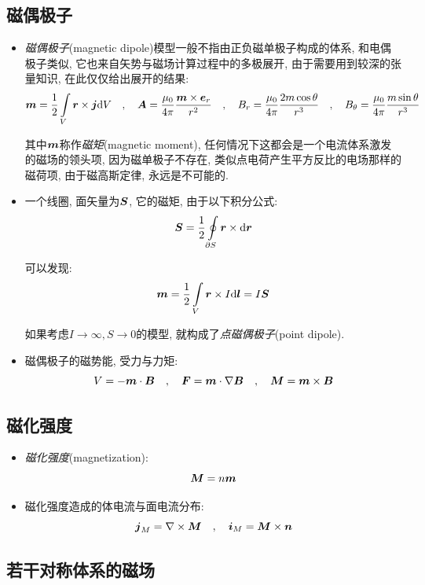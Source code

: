 \subsection{磁偶极子}

\begin{itemize}
\item \emph{磁偶极子}(magnetic dipole)模型一般不指由正负磁单极子构成的体系, 和电偶极子类似, 它也来自矢势与磁场计算过程中的多极展开, 由于需要用到较深的张量知识, 在此仅仅给出展开的结果:
\[\boldsymbol{m}=\frac{1}{2}\int\limits_V \boldsymbol{r}\times \boldsymbol{j}\textrm{d} V\quad ,\quad \boldsymbol{A}=\frac{\mu_0}{4\pi}\frac{\boldsymbol{m}\times \boldsymbol{e}_r}{r^2}\quad ,\quad B_r=\frac{\mu_0}{4\pi}\frac{2m\cos\theta }{r^3}\quad ,\quad B_\theta=\frac{\mu_0}{4\pi}\frac{m\sin\theta }{r^3}\]

其中$\boldsymbol{m}$称作\emph{磁矩}(magnetic moment), 任何情况下这都会是一个电流体系激发的磁场的领头项, 因为磁单极子不存在, 类似点电荷产生平方反比的电场那样的磁荷项, 由于磁高斯定律, 永远是不可能的.

\item 一个线圈, 面矢量为$\boldsymbol{S}$, 它的磁矩, 由于以下积分公式:
\[\boldsymbol{S}=\frac{1}{2}\oint\limits_{\partial S}\boldsymbol{r}\times \textrm{d} \boldsymbol{r}\]

可以发现:
\[\boldsymbol{m}=\frac{1}{2}\int\limits_V \boldsymbol{r}\times I \textrm{d} \boldsymbol{l}=I\boldsymbol{S}\]

如果考虑$I\to \infty, S\to 0$的模型, 就构成了\emph{点磁偶极子}(point dipole).

\item 磁偶极子的磁势能, 受力与力矩:
\[V=-\boldsymbol{m}\cdot \boldsymbol{B}\quad ,\quad \boldsymbol{F}=\boldsymbol{m}\cdot \nabla\boldsymbol{B}\quad ,\quad \boldsymbol{M}=\boldsymbol{m}\times \boldsymbol{B}\]

\end{itemize}

\subsection{磁化强度}

\begin{itemize}
\item \emph{磁化强度}(magnetization):
\[\boldsymbol{M}=n\boldsymbol{m}\]

\item 磁化强度造成的体电流与面电流分布:
\[\boldsymbol{j}_M=\nabla\times \boldsymbol{M}\quad ,\quad \boldsymbol{i}_M=\boldsymbol{M}\times \boldsymbol{n}\]


\end{itemize}

\subsection{若干对称体系的磁场}

